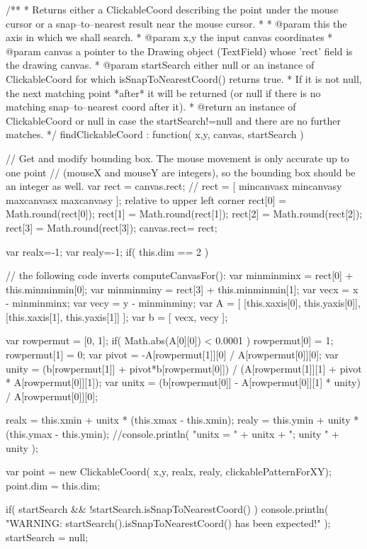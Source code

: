 {	/**
	 * Returns either a ClickableCoord describing the point under the mouse cursor or a snap--to--nearest result near the mouse cursor.
	 *
	 * @param this the axis in which we shall search.
	 * @param x,y the input canvas coordinates
	 * @param canvas a pointer to the Drawing object (TextField) whose 'rect' field is the drawing canvas.
	 * @param startSearch either null or an instance of ClickableCoord for which isSnapToNearestCoord() returns true.
	 *   If it is not null, the next matching point *after* it will be returned (or null if there is no matching snap--to--nearest coord after it).
	 * @return an instance of ClickableCoord or null in case the startSearch!=null and there are no further matches.
	 */
	findClickableCoord : function( x,y, canvas, startSearch )
	{
		// Get and modify bounding box. The mouse movement is only accurate up to one point
		// (mouseX and mouseY are integers), so the bounding box should be an integer as well.
		var rect = canvas.rect; // rect = [ mincanvasx mincanvasy maxcanvasx maxcanvasy ]; relative to upper left corner
		rect[0] = Math.round(rect[0]);
		rect[1] = Math.round(rect[1]);
		rect[2] = Math.round(rect[2]);
		rect[3] = Math.round(rect[3]);
		canvas.rect= rect;

		var realx=-1;
		var realy=-1;
		if( this.dim == 2 ) {
			// the following code inverts computeCanvasFor():
			var minminminx = rect[0] + this.minminmin[0];
			var minminminy = rect[3] + this.minminmin[1];
			var vecx = x - minminminx;
			var vecy = y - minminminy;
			var A = [
				[this.xaxis[0], this.yaxis[0]],
				[this.xaxis[1], this.yaxis[1]] ];
			var b = [ vecx, vecy ];

			var rowpermut = [0, 1];
			if( Math.abs(A[0][0]) < 0.0001 ) {
				rowpermut[0] = 1;
				rowpermut[1] = 0;
			}
			var pivot = -A[rowpermut[1]][0] / A[rowpermut[0]][0];
			var unity = (b[rowpermut[1]] + pivot*b[rowpermut[0]]) / (A[rowpermut[1]][1] + pivot * A[rowpermut[0]][1]);
			var unitx = (b[rowpermut[0]] - A[rowpermut[0]][1] * unity) / A[rowpermut[0]][0];

			realx = this.xmin + unitx * (this.xmax - this.xmin);
			realy = this.ymin + unity * (this.ymax - this.ymin);
			//console.println( "unitx = " + unitx + "; unity " + unity );
		}


		var point = new ClickableCoord( x,y, realx, realy, clickablePatternForXY);
		point.dim = this.dim;

		if( startSearch && !startSearch.isSnapToNearestCoord() ) {
			console.println( "WARNING: startSearch().isSnapToNearestCoord() has been expected!" );
			startSearch = null;
		}

}}

